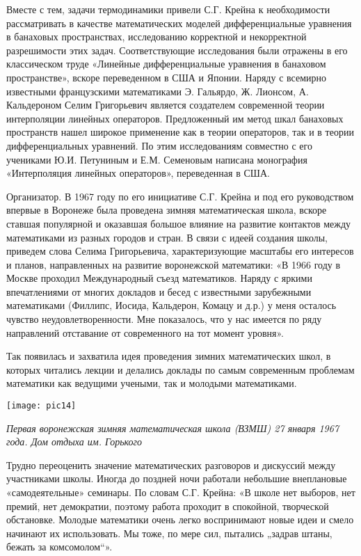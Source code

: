 Вместе с тем, задачи термодинамики привели С.Г. Крейна к необходимости рассматривать в качестве математических моделей дифференциальные уравнения в банаховых пространствах, исследованию корректной и некорректной разрешимости этих задач. Соответствующие исследования были отражены в его классическом труде «Линейные дифференциальные уравнения в банаховом пространстве», вскоре переведенном в США и Японии. Наряду с всемирно известными французскими математиками Э. Гальярдо, Ж. Лионсом, А. Кальдероном Селим Григорьевич является создателем современной теории интерполяции линейных операторов. Предложенный им метод шкал банаховых пространств нашел широкое применение как в теории операторов, так и в теории дифференциальных уравнений. По этим исследованиям совместно с его учениками Ю.И. Петуниным и Е.М. Семеновым написана монография «Интерполяция линейных операторов», переведенная в США.

Организатор. В 1967 году по его инициативе С.Г. Крейна и под его руководством впервые в Воронеже была проведена зимняя математическая школа, вскоре ставшая популярной и оказавшая большое влияние на развитие контактов между математиками из разных городов и стран. В связи с идеей создания школы, приведем слова Селима Григорьевича, характеризующие масштабы его интересов и планов, направленных на развитие воронежской математики: «В 1966 году в Москве проходил Международный съезд математиков. Наряду с яркими впечатлениями от многих докладов и бесед с известными зарубежными математиками (Филлипс, Иосида, Кальдерон, Комацу и д.р.) у меня осталось чувство неудовлетворенности. Мне показалось, что у нас имеется по ряду направлений отставание от современного на тот момент уровня».

Так появилась и захватила идея проведения зимних математических школ, в которых читались лекции и делались доклады по самым современным проблемам математики как ведущими учеными, так и молодыми математиками.


\begin{center}

\texttt{[image: pic14]}


{\it Первая воронежская зимняя математическая школа (ВЗМШ)
27 января 1967 года. Дом отдыха им. Горького}
\end{center}

Трудно переоценить значение математических разговоров и дискуссий между участниками школы. Иногда до поздней ночи работали небольшие внеплановые «самодеятельные» семинары. По словам С.Г. Крейна: «В школе нет выборов, нет премий, нет демократии, поэтому работа проходит в спокойной, творческой обстановке. Молодые математики очень легко воспринимают новые идеи и смело начинают их использовать. Мы тоже, по мере сил, пытались „задрав штаны, бежать за комсомолом“».

